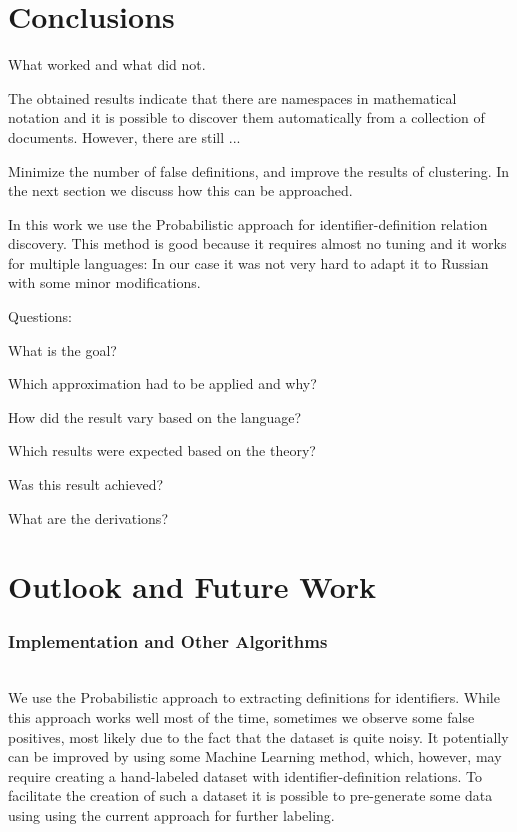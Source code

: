 \section{Conclusions}

What worked and what did not.


The obtained results indicate that there are namespaces in mathematical notation
and it is possible to discover them automatically from a collection of documents.
However, there are still ...

Minimize the number of false definitions, and improve the results of clustering.
In the next section we discuss how this can be approached.


In this work we use the Probabilistic approach for identifier-definition relation
discovery. This method is good because it requires almost no tuning and it works for
multiple languages: In our case it was not very hard to adapt it to Russian
with some minor modifications.


Questions:

What is the goal?

Which approximation had to be applied and why?

How did the result vary based on the language? 

Which results were expected based on the theory?

Was this result achieved? 

What are the derivations? 



\section{Outlook and Future Work}

\subsubsection{Implementation and Other Algorithms}  \ \\

We use the Probabilistic approach to extracting definitions for identifiers.
While this approach works well most of the time, sometimes we observe
some false positives, most likely due to the fact that the dataset is
quite noisy. It potentially can be improved by using some Machine Learning
method, which, however, may require creating a hand-labeled dataset
with identifier-definition relations. To facilitate the creation of such a
dataset it is possible to pre-generate some data using using the current approach
for further labeling.

